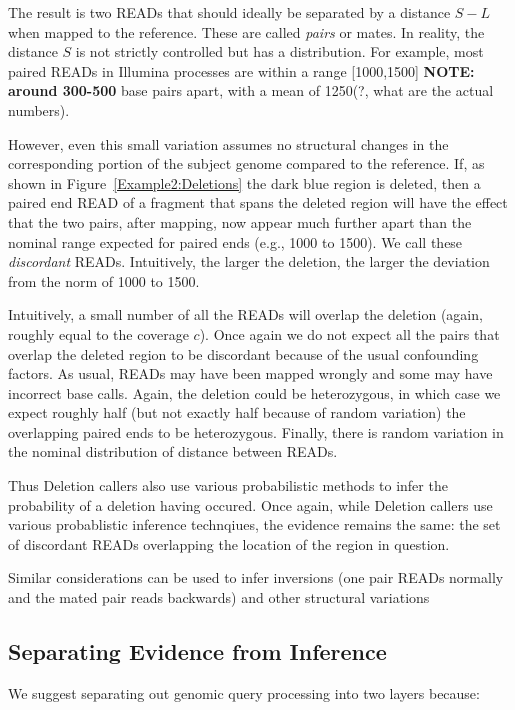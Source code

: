 \documentclass[10pt,fullpage]{article}
\begin{document}
The result is two READs that should ideally
be separated by a distance $S - L$ when mapped to the reference.
These are called {\em pairs} or {mates}.   In reality, the 
distance $S$ is not strictly controlled but has a distribution.
For example, most paired READs in Illumina processes are within
a range [1000,1500] {\bf NOTE: around 300-500} base pairs apart, with a mean of 1250(?, what
are the actual numbers).   

However, even this small variation assumes no structural changes in
the corresponding portion of the subject genome compared to the
reference.  If, as shown in Figure~\ref{Example2:Deletions} the
dark blue region is deleted, then a paired end READ of a fragment
that spans the deleted region will have the effect that the two
pairs, after mapping, now appear much further apart than the 
nominal range expected for paired ends (e.g., 1000 to 1500).   
We call these {\em discordant} READs.  Intuitively, the larger
the deletion, the larger the deviation from the norm of 1000 to 
1500.

Intuitively, a small number of all the READs will overlap the
deletion (again, roughly equal to the coverage $c$).  Once 
again we do not expect all the pairs that overlap the deleted
region to be discordant because of the usual confounding factors.  
As usual, READs may have been mapped wrongly and some may have
incorrect base calls.  Again, the deletion could be heterozygous,
in which case we expect roughly half (but not exactly half because
of random variation) the overlapping paired ends to 
be heterozygous.  Finally, there is random variation in the nominal
distribution of distance between READs.

Thus Deletion callers also use various probabilistic methods to
infer the probability of a deletion having occured.
Once again, while Deletion callers use various
probablistic inference technqiues, the evidence remains the same:
the set of discordant READs overlapping the location of the 
region in question.

Similar considerations can be used to infer inversions (one pair
READs normally and the mated pair reads backwards) and other
structural variations

\subsection{Separating Evidence from Inference}

We suggest separating out genomic query processing into two layers
because:
\end{document}
